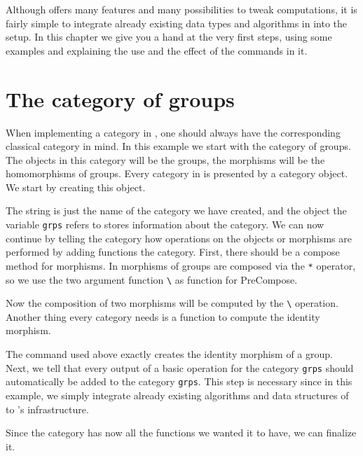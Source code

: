 Although \CapPkg offers many features and many possibilities to tweak computations,
it is fairly simple to integrate already existing data types and algorithms in \GAP
into the \CapPkg setup. In this chapter we give you a hand at the very first steps, using some
examples and explaining the use and the effect of the commands in it.

\section{The category of groups}

When implementing a category in \CapPkg, one should always have the corresponding classical
category in mind. In this example we start with the category of groups. The objects in this
category will be the groups, the morphisms will be the homomorphisms of groups. Every category
in \CapPkg is presented by a category \GAP object. We start by creating this object.



The string is just the name of the category we have created, and the object the variable
\texttt{grps} refers to stores information about the category. We can now continue by
telling the category how operations on the objects or morphisms are performed by adding
functions the category. First, there should be a compose method for morphisms. In \GAP
morphisms of groups are composed via the \texttt{*} operator, so we use the two
argument function \texttt{\textbackslash *} as function for \textrm{PreCompose}.



Now the composition of two morphisms will be computed by the \texttt{\textbackslash *} operation.
Another thing every category needs is a function to compute the identity morphism.



The command used above exactly creates the identity morphism of a group.
Next, we tell \CapPkg that every output of a basic operation for the category \texttt{grps} should automatically be added to the category \texttt{grps}.
This step is necessary since in this example, we simply integrate already existing algorithms and data structures of \GAP to
\CapPkg's infrastructure.



Since the category has now all the functions we wanted it to have, we can finalize it.

